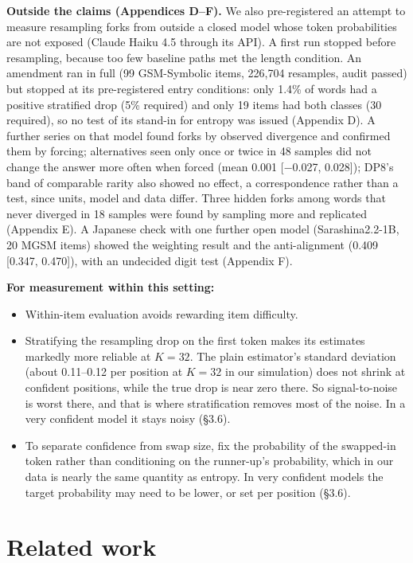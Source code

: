 \documentclass[
  10pt,
  a4paper,
]{article}
\providecommand{\tightlist}{%
  \setlength{\itemsep}{0pt}\setlength{\parskip}{0pt}}
\begin{document}
\textbf{Outside the claims (Appendices D--F).} We also pre-registered an attempt to measure resampling forks from outside a closed model whose token probabilities are not exposed (Claude Haiku 4.5
through its API). A first run stopped before resampling, because too few baseline paths met the length condition. An amendment ran in full (99 GSM-Symbolic items, 226,704 resamples, audit passed) but
stopped at its pre-registered entry conditions: only 1.4\% of words had a positive stratified drop (5\% required) and only 19 items had both classes (30 required), so no test of its stand-in for
entropy was issued (Appendix D). A further series on that model found forks by observed divergence and confirmed them by forcing; alternatives seen only once or twice in 48 samples did not change the
answer more often when forced (mean 0.001 {[}−0.027, 0.028{]}); DP8's band of comparable rarity also showed no effect, a correspondence rather than a test, since units, model and data differ. Three
hidden forks among words that never diverged in 18 samples were found by sampling more and replicated (Appendix E). A Japanese check with one further open model (Sarashina2.2-1B, 20 MGSM items) showed
the weighting result and the anti-alignment (0.409 {[}0.347, 0.470{]}), with an undecided digit test (Appendix F).

\textbf{For measurement within this setting:}

\begin{itemize}
\tightlist
\item
  Within-item evaluation avoids rewarding item difficulty.
\item
  Stratifying the resampling drop on the first token makes its estimates markedly more reliable at \(K = 32\). The plain estimator's standard deviation (about 0.11--0.12 per position at \(K = 32\) in
  our simulation) does not shrink at confident positions, while the true drop is near zero there. So signal-to-noise is worst there, and that is where stratification removes most of the noise. In a
  very confident model it stays noisy (§3.6).
\item
  To separate confidence from swap size, fix the probability of the swapped-in token rather than conditioning on the runner-up's probability, which in our data is nearly the same quantity as entropy.
  In very confident models the target probability may need to be lower, or set per position (§3.6).
\end{itemize}

\hypertarget{related-work}{%
\section{Related work}\label{related-work}}
\end{document}
